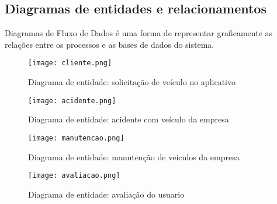 \subsection{Diagramas de entidades e relacionamentos}
Diagramas de Fluxo de Dados é uma forma de representar graficamente as relações entre os processos e as bases de dados do sistema.

\begin{figure}[H]
      \begin{center}
            \caption{Diagrama de entidade: solicitação de veículo no aplicativo} \label{aplicativo}
            \texttt{[image: cliente.png]} \\

      \end{center}
\end{figure}


\begin{figure}[H]
      \begin{center}
            \caption{Diagrama de entidade: acidente com veículo da empresa} \label{acidente}
            \texttt{[image: acidente.png]} \\

      \end{center}
\end{figure}

\begin{figure}[H]
      \begin{center}
            \caption{Diagrama de entidade: manutenção de veiculos da empresa} \label{manutencao}
            \texttt{[image: manutencao.png]} \\

      \end{center}
\end{figure}

\begin{figure}[H]
      \begin{center}
            \caption{Diagrama de entidade: avaliação do usuario} \label{avaliacao}
            \texttt{[image: avaliacao.png]} \\
      \end{center}
\end{figure}
